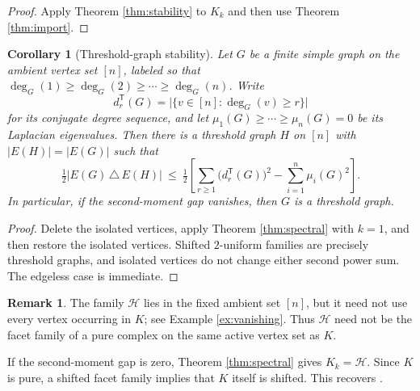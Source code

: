 \documentclass[11pt,reqno]{amsart}
\theoremstyle{plain}
\newtheorem{corollary}[theorem]{Corollary}
\theoremstyle{definition}
\newtheorem{remark}[theorem]{Remark}
\newcommand{\HH}{\mathcal{H}}
\begin{document}
\begin{proof}
Apply Theorem \ref{thm:stability} to $K_k$ and then use Theorem \ref{thm:import}.
\end{proof}

\begin{corollary}[Threshold-graph stability]\label{cor:graph}
Let $G$ be a finite simple graph on the ambient vertex set $[n]$, labeled so that
$\deg_G(1)\ge\deg_G(2)\ge\cdots\ge\deg_G(n)$. Write
\[
d_r^{\mathsf T}(G)=\bigl|\{v\in[n]:\deg_G(v)\ge r\}\bigr|
\]
for its conjugate degree sequence, and let
$\mu_1(G)\ge\cdots\ge\mu_n(G)=0$ be its Laplacian eigenvalues. Then there is a threshold graph $H$
on $[n]$ with $|E(H)|=|E(G)|$ such that
\[
\tfrac12\bigl|E(G)\,\triangle\,E(H)\bigr|
\ \le\ \tfrac12\left[
\sum_{r\ge1}\bigl(d_r^{\mathsf T}(G)\bigr)^2
-\sum_{i=1}^{n}\mu_i(G)^2
\right].
\]
In particular, if the second-moment gap vanishes, then $G$ is a threshold graph.
\end{corollary}

\begin{proof}
Delete the isolated vertices, apply Theorem \ref{thm:spectral} with $k=1$, and then restore the
isolated vertices. Shifted $2$-uniform families are precisely threshold graphs, and isolated
vertices do not change either second power sum. The edgeless case is immediate.
\end{proof}

\begin{remark}\label{rmk:ambient}
The family $\HH$ lies in the fixed ambient set $[n]$, but it need not use every vertex occurring in
$K$; see Example \ref{ex:vanishing}. Thus $\HH$ need not be the facet family of a pure complex on
the same active vertex set as $K$.
\end{remark}

If the second-moment gap is zero, Theorem \ref{thm:spectral} gives $K_k=\HH$. Since $K$ is pure, a
shifted facet family implies that $K$ itself is shifted. This recovers
\cite[Theorem 3.12]{Gupta}.
\end{document}
